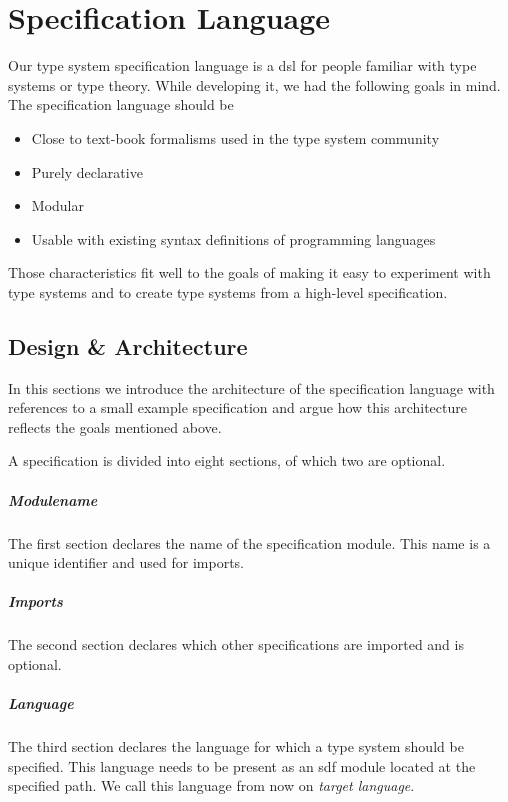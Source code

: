 \chapter{Specification Language}
\label{cha:spec-lang}
Our type system specification language is a \gls{dsl} for people
familiar with type systems or type theory. While developing it, we had
the following goals in mind. The specification language should be

\begin{itemize}
\item Close to text-book formalisms used in the type system community
\item Purely declarative
\item Modular
\item Usable with existing syntax definitions of programming languages
\end{itemize}

Those characteristics fit well to the goals of making it easy to
experiment with type systems and to create type systems from a
high-level specification.
\section{Design \& Architecture}
\label{sec:design--architecture}
In this sections we introduce the architecture of the specification
language with references to a small example specification and argue
how this architecture reflects the goals mentioned above.

A specification is divided into eight sections, of which two are
optional.

\paragraph{Modulename} The first section declares the name of the
specification module. This name is a unique identifier and used for
imports.

\paragraph{Imports} The second section declares which other
specifications are imported and is optional.

\paragraph{Language} The third section declares the language for which
a type system should be specified. This language needs to be present
as an \gls{sdf} module located at the specified path. We call this
language from now on \textit{target language}.

